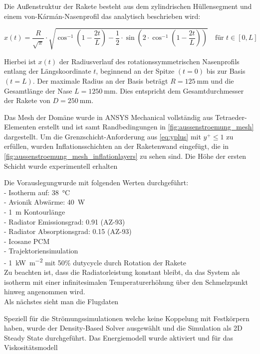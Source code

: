 Die Außenstruktur der Rakete besteht aus dem zylindrischen Hüllensegment und einem von-Kármán-Nasenprofil das analytisch
beschrieben wird:

\begin{equation*}
  \label{eq:karman_nase}
  x(t) = \frac{R}{\sqrt{\pi}} \cdot \sqrt{
  \cos^{-1}\left(1 - \frac{2t}{L} \right)
  - \frac{1}{2} \cdot \sin\left(2 \cdot \cos^{-1}\left(1 - \frac{2t}{L} \right) \right)
  }
  \quad \text{für } t \in [0, L]
\end{equation*}

Hierbei ist $x(t)$ der Radiusverlauf des rotationssymmetrischen Nasenprofils entlang der Längskoordinate $t$, beginnend an der Spitze $(t=0)$ bis zur Basis $(t=L)$.
Der maximale Radius an der Basis beträgt $R = \SI{125}{\milli\meter}$ und die Gesamtlänge der Nase $L = \SI{1250}{\milli\meter}$.
Dies entspricht dem Gesamtdurchmesser der Rakete von $D = \SI{250}{\milli\meter}$.

Das Mesh der Domäne wurde in ANSYS Mechanical vollständig aus Tetraeder-Elementen erstellt und ist samt Randbedingungen in \ref{fig:aussenstroemung_mesh} dargestellt.
Um die Grenzschicht-Anforderung aus \ref{eq:yplus} mit $y^+ \leq 1$ zu erfüllen, wurden Inflationsschichten an der Raketenwand eingefügt, die in \ref{fig:aussenstroemung_mesh_inflationlayers}
zu sehen sind. Die Höhe der ersten Schicht wurde experimentell erhalten \cite{Anderson-2017}

Die Vorauslegungwurde mit folgenden Werten durchgeführt:\\
- Isotherm auf: \SI{38}{\celsius}\\
- Avionik Abwärme: \SI{40}{W}\\
- \SI{1}{m} Kontourlänge\\
- Radiator Emissionsgrad: \SI{0,91}{} (AZ-93)\\
- Radiator Absorptionsgrad: \SI{0,15}{} (AZ-93)\\
- Icosane PCM\\
- Trajektoriensimulation\\
- \SI{1}{\kilo\watt\per\meter\squared} mit 50\% dutycycle durch Rotation der Rakete\\
Zu beachten ist, dass die Radiatorleistung konstant bleibt, da das System als isotherm mit einer
infinitesimalen Temperaturerhöhung über den Schmelzpunkt hinweg angenommen wird.\\
Als nächstes sieht man die Flugdaten

Speziell für die Strömungssimulationen welche keine Koppelung mit Festkörpern haben, wurde der Density-Based Solver ausgewählt und die
Simulation als 2D Steady State durchgeführt. Das Energiemodell wurde aktiviert und für das Viskositätsmodell~\cite{Irving-2021}

